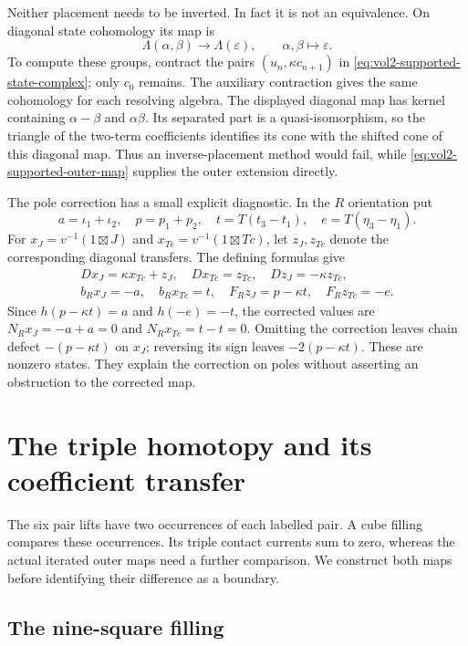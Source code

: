 Neither placement needs to be inverted. In fact it is not an
equivalence. On diagonal state cohomology its map is
\[
 \Lambda(\alpha,\beta)\longrightarrow\Lambda(\varepsilon),
 \qquad \alpha,\beta\longmapsto\varepsilon.
\]
To compute these groups, contract the pairs
$(u_n,\kappa c_{n+1})$ in \eqref{eq:vol2-supported-state-complex};
only $c_0$ remains. The auxiliary contraction gives the same
cohomology for each resolving algebra. The displayed diagonal
map has kernel containing $\alpha-\beta$ and $\alpha\beta$.
Its separated part is a quasi-isomorphism, so the triangle of
the two-term coefficients identifies its cone with the shifted
cone of this diagonal map. Thus an inverse-placement method
would fail, while \eqref{eq:vol2-supported-outer-map} supplies
the outer extension directly.

The pole correction has a small explicit diagnostic. In the
$R$ orientation put
\[
 a=\iota_1+\iota_2,\quad p=p_1+p_2,\quad
 t=T(t_3-t_1),\quad e=T(\eta_3-\eta_1).
\]
For $x_J=v^{-1}(1\boxtimes J)$ and
$x_{Tc}=v^{-1}(1\boxtimes Tc)$, let $z_J,z_{Tc}$ denote the
corresponding diagonal transfers. The defining formulas give
\[
 \begin{gathered}
 Dx_J=\kappa x_{Tc}+z_J,\quad Dx_{Tc}=z_{Tc},\quad
 Dz_J=-\kappa z_{Tc},\\
 b_Rx_J=-a,\quad b_Rx_{Tc}=t,\quad
 F_Rz_J=p-\kappa t,\quad F_Rz_{Tc}=-e.
 \end{gathered}
\]
Since $h(p-\kappa t)=a$ and $h(-e)=-t$, the corrected
values are $N_Rx_J=-a+a=0$ and $N_Rx_{Tc}=t-t=0$.
Omitting the correction leaves chain defect $-(p-\kappa t)$
on $x_J$; reversing its sign leaves $-2(p-\kappa t)$.
These are nonzero states. They explain the correction on
poles without asserting an obstruction to the corrected map.

\section{The triple homotopy and its coefficient transfer}
\label{sec:vol2-supported-triple-homotopy}

The six pair lifts have two occurrences of each labelled pair.
A cube filling compares these occurrences. Its triple contact
currents sum to zero, whereas the actual iterated outer maps
need a further comparison. We construct both maps before
identifying their difference as a boundary.

\subsection{The nine-square filling}

